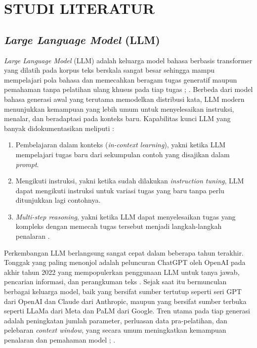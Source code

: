 \cleardoublepage %
\chapter{STUDI LITERATUR}
\label{chap:studi-literatur}
\section{\textit{Large Language Model} (LLM)}
\textit{Large Language Model} (LLM) adalah keluarga model bahasa berbasis transformer yang dilatih pada korpus teks berskala sangat besar sehingga mampu mempelajari pola bahasa dan memecahkan beragam tugas generatif maupun pemahaman tanpa pelatihan ulang khusus pada tiap tugas \parencite{zhao2023survey}; \parencite{minaee2024large}. Berbeda dari model bahasa generasi awal yang terutama memodelkan distribusi kata, LLM modern menunjukkan kemampuan yang lebih umum untuk menyelesaikan instruksi, menalar, dan beradaptasi pada konteks baru. Kapabilitas kunci LLM yang banyak didokumentasikan meliputi :

\begin{enumerate}[1.]
\item Pembelajaran dalam konteks (\textit{in-context learning}), yakni ketika LLM mempelajari tugas baru dari sekumpulan contoh yang disajikan dalam \textit{prompt}.
\item Mengikuti instruksi, yakni ketika sudah dilakukan \textit{instruction tuning}, LLM dapat mengikuti instruksi untuk variasi tugas yang baru tanpa perlu ditunjukkan lagi contohnya.
\item \textit{Multi-step reasoning}, yakni ketika LLM dapat menyelesaikan tugas yang kompleks dengan memecah tugas tersebut menjadi langkah-langkah penalaran \parencite{minaee2024large}.
\end{enumerate}


Perkembangan LLM berlangsung sangat cepat dalam beberapa tahun terakhir. Tonggak yang paling menonjol adalah peluncuran ChatGPT oleh OpenAI pada akhir tahun 2022 yang mempopulerkan penggunaan LLM untuk tanya jawab, pencarian informasi, dan perangkuman teks \parencite{minaee2024large}. Sejak saat itu bermunculan berbagai keluarga model, baik yang bersifat sumber tertutup seperti seri GPT dari OpenAI dan Claude dari Anthropic, maupun yang bersifat sumber terbuka seperti LLaMa dari Meta dan PaLM dari Google. Tren utama pada tiap generasi adalah peningkatan jumlah parameter, perluasan data pra-pelatihan, dan pelebaran \textit{context window}, yang secara umum meningkatkan kemampuan penalaran dan pemahaman model \parencite{zhao2023survey}; \parencite{minaee2024large}.

